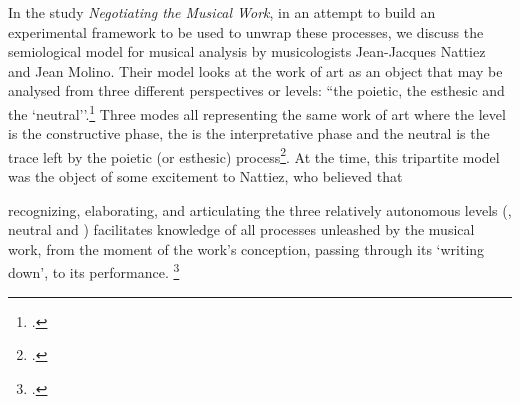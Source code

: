 In the study \emph{Negotiating the Musical Work}, in an attempt to build an experimental framework to be used to unwrap these processes, we discuss the semiological model for musical analysis by musicologists Jean-Jacques Nattiez and Jean Molino. Their model looks at the work of art as an object that may be analysed from three different perspectives or levels: ``the poietic, the esthesic and the `neutral''.\footcite{molino} Three modes all representing the same work of art where the  level is the constructive phase, the  is the interpretative phase and the neutral is the trace left by the poietic (or esthesic) process\footcite{molino}\nocite{molino2}. At the time, this tripartite model was the object of some excitement to Nattiez, who believed that 
\begin{squote}
[\ldots] recognizing, elaborating, and articulating the three relatively autonomous levels (, neutral and ) facilitates knowledge of all processes unleashed by the musical work, from the moment of the work's conception, passing through its `writing down', to its performance. \footcite{nattiez}
\end{squote}

